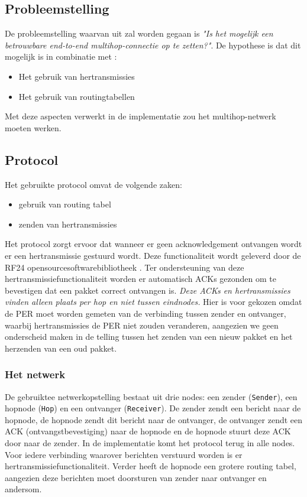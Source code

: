 \documentclass{article}
\begin{document}
\subsection{Probleemstelling}

De probleemstelling waarvan uit zal worden gegaan is \textit{"Is het mogelijk een betrouwbare end-to-end multihop-connectie op te zetten?"}. De hypothese is dat dit mogelijk is in combinatie met :
\begin{itemize}
	\item Het gebruik van hertransmissies
	\item Het gebruik van routingtabellen
\end{itemize}
Met deze aspecten verwerkt in de implementatie zou het multihop-netwerk moeten werken. 
\subsection{Protocol}
Het gebruikte protocol omvat de volgende zaken:
\begin{itemize}
	\item gebruik van routing tabel
	\item zenden van hertransmissies
\end{itemize}
Het protocol zorgt ervoor dat wanneer er geen acknowledgement ontvangen wordt er een hertransmissie gestuurd wordt. Deze functionaliteit wordt geleverd door de RF24 opensourcesoftwarebibliotheek \cite{rf24}. Ter ondersteuning van deze hertransmissiefunctionaliteit worden er automatisch ACKs gezonden om te bevestigen dat een pakket correct ontvangen is. \emph{Deze ACKs en hertransmissies vinden alleen plaats per hop en niet tussen eindnodes.} Hier is voor gekozen omdat de PER moet worden gemeten van de verbinding tussen zender en ontvanger, waarbij hertransmissies de PER niet zouden veranderen, aangezien we geen onderscheid maken in de telling tussen het zenden van een nieuw pakket en het herzenden van een oud pakket.

\subsubsection{Het netwerk}
De gebruiktee netwerkopstelling bestaat uit drie nodes: een zender (\texttt{Sender}), een hopnode (\texttt{Hop}) en een ontvanger (\texttt{Receiver}). De zender zendt een bericht naar de hopnode, de hopnode zendt dit bericht naar de ontvanger, de ontvanger zendt een ACK (ontvangstbevestiging) naar de hopnode en de hopnode stuurt deze ACK door naar de zender. In de implementatie komt het protocol terug in alle nodes. Voor iedere verbinding waarover berichten verstuurd worden is er hertransmissiefunctionaliteit. Verder heeft de hopnode een grotere routing tabel, aangezien deze berichten moet doorsturen van zender naar ontvanger en andersom.
\end{document}
